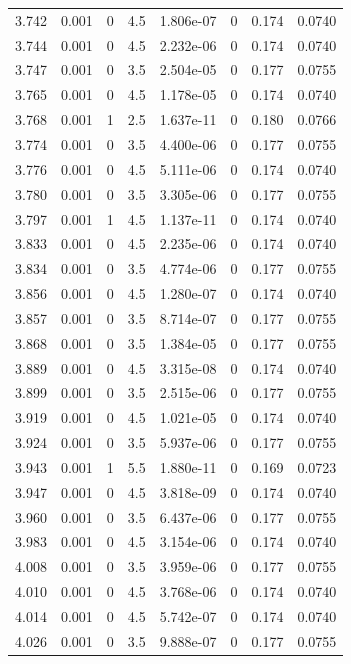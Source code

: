 \documentclass[preview]{standalone}
\begin{document}
{{{{{{{{\begin{tabular}{L{1.2cm}C{1.2cm} C{0.3cm}C{0.5cm} C{1.4cm}C{1.4cm} C{1.4cm}C{1.4cm}}
  3.742  &  0.001  & 0     & 4.5 &  1.806e-07  & 0  & 0.174 &  0.0740   \\ 
  3.744  &  0.001  & 0     & 4.5 &  2.232e-06  & 0  & 0.174 &  0.0740   \\ 
  3.747  &  0.001  & 0     & 3.5 &  2.504e-05  & 0  & 0.177 &  0.0755   \\ 
  3.765  &  0.001  & 0     & 4.5 &  1.178e-05  & 0  & 0.174 &  0.0740   \\ 
  3.768  &  0.001  & 1     & 2.5 &  1.637e-11  & 0  & 0.180 &  0.0766   \\ 
  3.774  &  0.001  & 0     & 3.5 &  4.400e-06  & 0  & 0.177 &  0.0755   \\ 
  3.776  &  0.001  & 0     & 4.5 &  5.111e-06  & 0  & 0.174 &  0.0740   \\ 
  3.780  &  0.001  & 0     & 3.5 &  3.305e-06  & 0  & 0.177 &  0.0755   \\ 
  3.797  &  0.001  & 1     & 4.5 &  1.137e-11  & 0  & 0.174 &  0.0740   \\ 
  3.833  &  0.001  & 0     & 4.5 &  2.235e-06  & 0  & 0.174 &  0.0740   \\ 
  3.834  &  0.001  & 0     & 3.5 &  4.774e-06  & 0  & 0.177 &  0.0755   \\ 
  3.856  &  0.001  & 0     & 4.5 &  1.280e-07  & 0  & 0.174 &  0.0740   \\ 
  3.857  &  0.001  & 0     & 3.5 &  8.714e-07  & 0  & 0.177 &  0.0755   \\ 
  3.868  &  0.001  & 0     & 3.5 &  1.384e-05  & 0  & 0.177 &  0.0755   \\ 
  3.889  &  0.001  & 0     & 4.5 &  3.315e-08  & 0  & 0.174 &  0.0740   \\ 
  3.899  &  0.001  & 0     & 3.5 &  2.515e-06  & 0  & 0.177 &  0.0755   \\ 
  3.919  &  0.001  & 0     & 4.5 &  1.021e-05  & 0  & 0.174 &  0.0740   \\ 
  3.924  &  0.001  & 0     & 3.5 &  5.937e-06  & 0  & 0.177 &  0.0755   \\ 
  3.943  &  0.001  & 1     & 5.5 &  1.880e-11  & 0  & 0.169 &  0.0723   \\ 
  3.947  &  0.001  & 0     & 4.5 &  3.818e-09  & 0  & 0.174 &  0.0740   \\ 
  3.960  &  0.001  & 0     & 3.5 &  6.437e-06  & 0  & 0.177 &  0.0755   \\ 
  3.983  &  0.001  & 0     & 4.5 &  3.154e-06  & 0  & 0.174 &  0.0740   \\ 
  4.008  &  0.001  & 0     & 3.5 &  3.959e-06  & 0  & 0.177 &  0.0755   \\ 
  4.010  &  0.001  & 0     & 4.5 &  3.768e-06  & 0  & 0.174 &  0.0740   \\ 
  4.014  &  0.001  & 0     & 4.5 &  5.742e-07  & 0  & 0.174 &  0.0740   \\ 
  4.026  &  0.001  & 0     & 3.5 &  9.888e-07  & 0  & 0.177 &  0.0755   \\ 
\hline 
\end{tabular} 

}}}}}}}}
\end{document}
